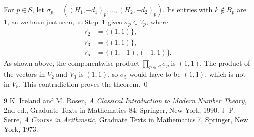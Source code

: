 \documentclass[11pt]{article}
\begin{document}
For $p\in S$, let $\sigma_p=((H_1,-d_1)_p,\dots,(H_{2},-d_{2})_p)$. Its entries with $k\notin B_p$ are $1$, as we have just seen, so Step~1 gives $\sigma_p\in V_p$, where
\begin{align*}
V_{2}&=\{(1,1)\},\\
V_{3}&=\{(1,1)\},\\
V_{5}&=\{(1,-1),(-1,1)\}.
\end{align*}
As shown above, the componentwise product $\prod_{p\in S}\sigma_p$ is $(1,1)$. The product of the vectors in $V_{2}$ and $V_{3}$ is $(1,1)$, so $\sigma_{5}$ would have to be $(1,1)$, which is not in $V_{5}$. This contradiction proves the theorem.
\qed

\begin{thebibliography}{9}
 K. Ireland and M. Rosen, \emph{A Classical Introduction to Modern Number Theory}, 2nd ed., Graduate Texts in Mathematics 84, Springer, New York, 1990.
 J.-P. Serre, \emph{A Course in Arithmetic}, Graduate Texts in Mathematics 7, Springer, New York, 1973.
\end{thebibliography}
\end{document}
